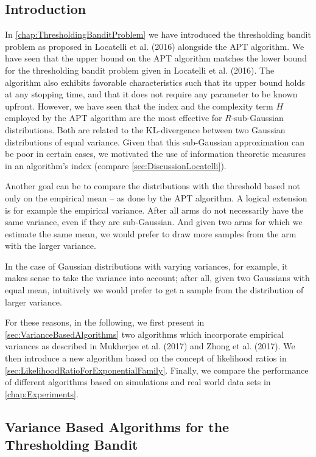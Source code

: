 \documentclass[11pt,]{article}
\begin{document}
\subsection{\texorpdfstring{Introduction
\label{sec:ExtensionsIntroduction}}{Introduction }}\label{introduction-1}

In \autoref{chap:ThresholdingBanditProblem} we have introduced the
thresholding bandit problem as proposed in Locatelli et al. (2016)
alongside the APT algorithm. We have seen that the upper bound on the
APT algorithm matches the lower bound for the thresholding bandit
problem given in Locatelli et al. (2016). The algorithm also exhibits
favorable characteristics such that its upper bound holds at any
stopping time, and that it does not require any parameter to be known
upfront. However, we have seen that the index and the complexity term
\(H\) employed by the APT algorithm are the most effective for
\(R\)-sub-Gaussian distributions. Both are related to the KL-divergence
between two Gaussian distributions of equal variance. Given that this
sub-Gaussian approximation can be poor in certain cases, we motivated
the use of information theoretic measures in an algorithm's index
(compare \autoref{sec:DiscussionLocatelli}).

Another goal can be to compare the distributions with the threshold
based not only on the empirical mean -- as done by the APT algorithm. A
logical extension is for example the empirical variance. After all arms
do not necessarily have the same variance, even if they are
sub-Gaussian. And given two arms for which we estimate the same mean, we
would prefer to draw more samples from the arm with the larger variance.

In the case of Gaussian distributions with varying variances, for
example, it makes sense to take the variance into account; after all,
given two Gaussians with equal mean, intuitively we would prefer to get
a sample from the distribution of larger variance.

For these reasons, in the following, we first present in
\autoref{sec:VarianceBasedAlgorithms} two algorithms which incorporate
empirical variances as described in Mukherjee et al. (2017) and Zhong et
al. (2017). We then introduce a new algorithm based on the concept of
likelihood ratios in \autoref{sec:LikelihoodRatioForExponentialFamily}.
Finally, we compare the performance of different algorithms based on
simulations and real world data sets in \autoref{chap:Experiments}.

\subsection{\texorpdfstring{Variance Based Algorithms for the
Thresholding Bandit
\label{sec:VarianceBasedAlgorithms}}{Variance Based Algorithms for the Thresholding Bandit }}\label{variance-based-algorithms-for-the-thresholding-bandit}
\end{document}
